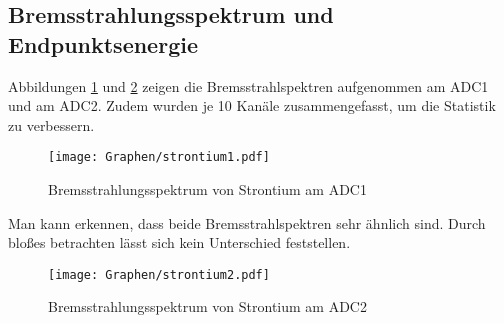 \documentclass[twoside,colorback,accentcolor=tud4c,11pt]{tudreport}
\begin{document}
\subsection{Bremsstrahlungsspektrum und Endpunktsenergie}
Abbildungen \ref{4.2.1a} und \ref{4.2.1b} zeigen die Bremsstrahlspektren aufgenommen am ADC1 und am ADC2. Zudem wurden je 10 Kanäle zusammengefasst, um die Statistik zu verbessern.  
\begin{figure}[H]
\centering
   	\begin{minipage}[b]{1\textwidth}
   	\texttt{[image: Graphen/strontium1.pdf]}
   	\caption{Bremsstrahlungsspektrum von Strontium am ADC1}
  	\label{4.2.1a}
   	\end{minipage}
\end{figure} 
Man kann erkennen, dass beide Bremsstrahlspektren sehr ähnlich sind. Durch bloßes betrachten lässt sich kein Unterschied feststellen. 
\begin{figure}[H]
\centering
   	\begin{minipage}[b]{1\textwidth}
   	\texttt{[image: Graphen/strontium2.pdf]}
   	\caption{Bremsstrahlungsspektrum von Strontium am ADC2}
  	\label{4.2.1b}
   	\end{minipage}
\end{figure}  
\end{document}
